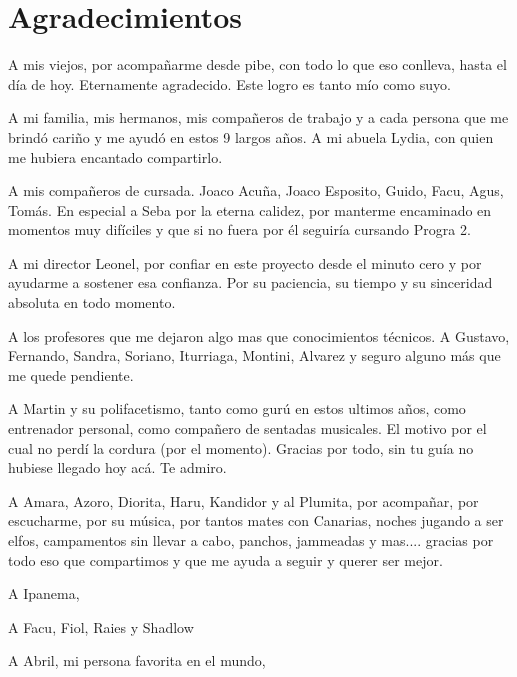 \chapter*{Agradecimientos}

\begingroup
\raggedbottom

\noindent A mis viejos, por acompañarme desde pibe, con todo lo que eso conlleva, hasta el día de hoy. Eternamente agradecido. Este logro es tanto mío como suyo.

\medskip
\noindent A mi familia, mis hermanos, mis compañeros de trabajo y a cada persona que me brindó cariño y me ayudó en estos 9 largos años. A mi abuela Lydia, con quien me hubiera encantado compartirlo.

\medskip
\noindent A mis compañeros de cursada. Joaco Acuña, Joaco Esposito, Guido, Facu, Agus, Tomás. En especial a Seba por la eterna calidez, por manterme encaminado en momentos muy difíciles y que si no fuera por él seguiría cursando Progra 2.

\medskip
\noindent A mi director Leonel, por confiar en este proyecto desde el minuto cero y por ayudarme a sostener esa confianza. Por su paciencia, su tiempo y su sinceridad absoluta en todo momento.

\medskip
\noindent A los profesores que me dejaron algo mas que conocimientos técnicos. A Gustavo, Fernando, Sandra, Soriano, Iturriaga, Montini, Alvarez y seguro alguno más que me quede pendiente.

\medskip
\noindent A Martin y su polifacetismo, tanto como gurú en estos ultimos años, como entrenador personal, como compañero de sentadas musicales. El motivo por el cual no perdí la cordura (por el momento). Gracias por todo, sin tu guía no hubiese llegado hoy acá. Te admiro.

\medskip
\noindent A Amara, Azoro, Diorita, Haru, Kandidor y al Plumita, por acompañar, por escucharme, por su música, por tantos mates con Canarias, noches jugando a ser elfos, campamentos sin llevar a cabo, panchos, jammeadas y mas.... gracias por todo eso que compartimos y que me ayuda a seguir y querer ser mejor.

\medskip
\noindent A Ipanema,

\medskip
\noindent A Facu, Fiol, Raies y Shadlow

\medskip
\noindent A Abril, mi persona favorita en el mundo,

\endgroup
